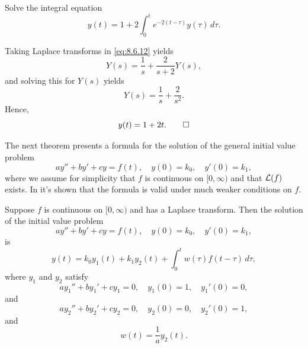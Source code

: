 \begin{example}\label{example:8.6.7}
 Solve the integral equation
\begin{equation}\label{eq:8.6.12}
y(t)=1+2\int_0^t e^{-2(t-\tau)} y(\tau)\,d\tau.
\end{equation}
\end{example}

\begin{solution}
Taking Laplace transforms in \eqref{eq:8.6.12} yields
\[
Y(s)=\frac{1}{s}+\frac{2}{s+2} Y(s),
\]
and solving this for $Y(s)$ yields
\[
Y(s)=\frac{1}{s}+\frac{2}{s^2}.
\]
Hence,
\[
y(t)=1+2t.\qedhere
\]
\end{solution}



The next theorem presents a formula for the solution of
the general initial value problem
\[
ay''+by'+cy=f(t),\quad y(0)=k_0,\quad y'(0)=k_1,
\]
where we assume for simplicity that $f$ is continuous on $[0,\infty)$
and that ${\mathcal L}(f)$ exists. In
 it's shown that the formula is
valid under much weaker conditions on $f$.

\begin{theorem}\label{thmtype:8.6.3}
Suppose $f$  is continuous on $[0,\infty)$ and has a Laplace
transform. Then the solution of the initial value problem
\begin{equation}\label{eq:8.6.13}
ay''+by'+cy=f(t),\quad y(0)=k_0,\quad y'(0)=k_1,
\end{equation}
is
\begin{equation}\label{eq:8.6.14}
y(t)=k_0y_1(t)+k_1y_2(t)+\int_0^tw(\tau)f(t-\tau)\,d\tau,
\end{equation}
where $y_1$  and $y_2$  satisfy
\begin{equation}\label{eq:8.6.15}
ay_1''+by_1'+cy_1=0,\quad y_1(0)=1,\quad y_1'(0)=0,
\end{equation}
and
\begin{equation}\label{eq:8.6.16}
ay_2''+by_2'+cy_2=0,\quad y_2(0)=0,\quad y_2'(0)=1,
\end{equation}
and
\begin{equation}\label{eq:8.6.17}
w(t)=\frac{1}{a}y_2(t).
\end{equation}
\end{theorem}


